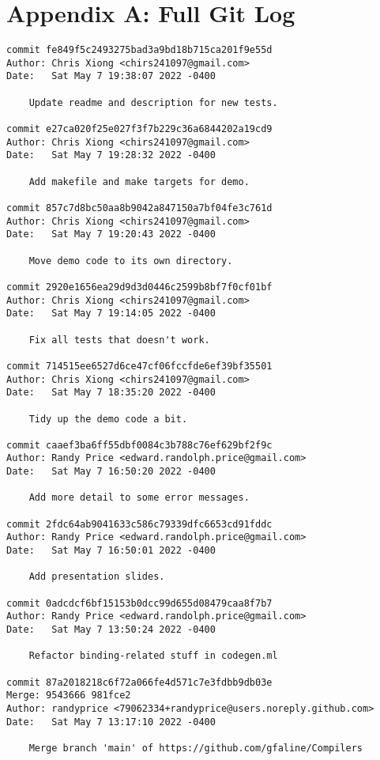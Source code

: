 \section{Appendix A: Full Git Log}

{\scriptsize
\begin{verbatim}
commit fe849f5c2493275bad3a9bd18b715ca201f9e55d
Author: Chris Xiong <chirs241097@gmail.com>
Date:   Sat May 7 19:38:07 2022 -0400

    Update readme and description for new tests.

commit e27ca020f25e027f3f7b229c36a6844202a19cd9
Author: Chris Xiong <chirs241097@gmail.com>
Date:   Sat May 7 19:28:32 2022 -0400

    Add makefile and make targets for demo.

commit 857c7d8bc50aa8b9042a847150a7bf04fe3c761d
Author: Chris Xiong <chirs241097@gmail.com>
Date:   Sat May 7 19:20:43 2022 -0400

    Move demo code to its own directory.

commit 2920e1656ea29d9d3d0446c2599b8bf7f0cf01bf
Author: Chris Xiong <chirs241097@gmail.com>
Date:   Sat May 7 19:14:05 2022 -0400

    Fix all tests that doesn't work.

commit 714515ee6527d6ce47cf06fccfde6ef39bf35501
Author: Chris Xiong <chirs241097@gmail.com>
Date:   Sat May 7 18:35:20 2022 -0400

    Tidy up the demo code a bit.

commit caaef3ba6ff55dbf0084c3b788c76ef629bf2f9c
Author: Randy Price <edward.randolph.price@gmail.com>
Date:   Sat May 7 16:50:20 2022 -0400

    Add more detail to some error messages.

commit 2fdc64ab9041633c586c79339dfc6653cd91fddc
Author: Randy Price <edward.randolph.price@gmail.com>
Date:   Sat May 7 16:50:01 2022 -0400

    Add presentation slides.

commit 0adcdcf6bf15153b0dcc99d655d08479caa8f7b7
Author: Randy Price <edward.randolph.price@gmail.com>
Date:   Sat May 7 13:50:24 2022 -0400

    Refactor binding-related stuff in codegen.ml

commit 87a2018218c6f72a066fe4d571c7e3fdbb9db03e
Merge: 9543666 981fce2
Author: randyprice <79062334+randyprice@users.noreply.github.com>
Date:   Sat May 7 13:17:10 2022 -0400

    Merge branch 'main' of https://github.com/gfaline/Compilers


\end{verbatim}}

